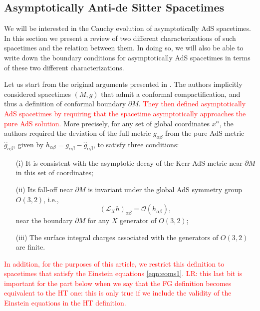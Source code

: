 \documentclass[a4paper,11pt]{article}
\numberwithin{equation}{section}
\begin{document}
\subsection{Asymptotically Anti-de Sitter Spacetimes}\label{subsec:asyAdS}

We will be interested in the Cauchy evolution of asymptotically AdS spacetimes. In this section we present a review of two different characterizations of such spacetimes and the relation between them. In doing so, we will also be able to write down the boundary conditions for asymptotically AdS spacetimes in terms of these two different characterizations.

Let us start from the original arguments presented in \cite{Henneaux:1985tv}. 
The authors implicitly considered spacetimes $(M,g)$ that admit a conformal compactification, and thus a definition of conformal boundary $\partial M$.
\textcolor{red}{They then defined asymptotically AdS spacetimes by requiring that the spacetime asymptotically approaches the pure AdS solution.}
More precisely, for any set of global coordinates $x^\alpha$, the authors required the deviation of the full metric $g_{\alpha\beta}$ from the pure AdS metric $\hat{g}_{\alpha\beta}$, given by $h_{\alpha\beta}=g_{\alpha\beta}-\hat{g}_{\alpha\beta}$, to satisfy three conditions:
\begin{enumerate}
\item[(i)] It is consistent with the asymptotic decay of the Kerr-AdS metric near $\partial M$ in this set of coordinates;
\item[(ii)] Its fall-off near $\partial M$ is invariant under the global AdS symmetry group $O(3,2)$, i.e.,
\begin{equation}\label{eqn:asyKilleq}
(\mathcal{L}_X h)_{\alpha\beta}=\mathcal{O}(h_{\alpha\beta}),
\end{equation}
near the boundary $\partial M$ for any $X$ generator of $O(3,2)$;
\item[(iii)] The surface integral charges associated with the generators of $O(3,2)$ are finite.
\end{enumerate}
\textcolor{red}{In addition, for the purposes of this article, we restrict this definition to spacetimes that satisfy the Einstein equations \eqref{eqn:eoms1}.}
\textcolor{red}{LR: this last bit is important for the part below when we say that the FG definition becomes equivalent to the HT one: this is only true if we include the validity of the Einstein equations in the HT definition.}
\end{document}
